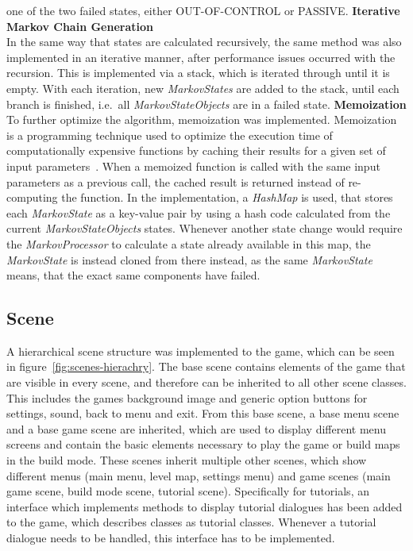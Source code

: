 one of the two failed states, either OUT-OF-CONTROL or PASSIVE\@.
\textbf{Iterative Markov Chain Generation}\\
In the same way that states are calculated recursively, the same method was also implemented in an iterative manner,
after performance issues occurred with the recursion.
This is implemented via a stack, which is iterated through until it is empty.
With each iteration, new \textit{MarkovStates} are added to the stack, until each branch is finished, i.e.\ all \textit{MarkovStateObjects}
are in a failed state.
\textbf{Memoization}\\
To further optimize the algorithm, memoization was implemented.
Memoization is a programming technique used to optimize the execution time of computationally expensive functions by caching
their results for a given set of input parameters~\cite{10.5555/971738.971743}.
When a memoized function is called with the same input parameters as a previous call, the cached result is returned instead of re-computing the function.
In the implementation, a \textit{HashMap} is used, that stores each \textit{MarkovState} as a key-value pair by using a hash code
calculated from the current \textit{MarkovStateObjects} states.
Whenever another state change would require the \textit{MarkovProcessor} to calculate a state already available in this map, the \textit{MarkovState}
is instead cloned from there instead,
as the same \textit{MarkovState} means, that the exact same components have failed.

\subsection{Scene}\label{subsec:scenes}
A hierarchical scene structure was implemented to the game, which can be seen in figure~\ref{fig:scenes-hierachry}.
The base scene contains elements of the game that are visible in every scene, and therefore can be inherited to all other scene classes.
This includes the games background image and generic option buttons for settings, sound, back to menu and exit.
From this base scene, a base menu scene and a base game scene are inherited, which are used to display different menu screens and contain
the basic elements necessary to play the game or build maps in the build mode.
These scenes inherit multiple other scenes, which show different menus (main menu, level map, settings menu) and game scenes (main game scene, build mode scene, tutorial scene).
Specifically for tutorials, an interface which implements methods to display tutorial dialogues has been added to the game, which describes classes as tutorial classes.
Whenever a tutorial dialogue needs to be handled, this interface has to be implemented.

